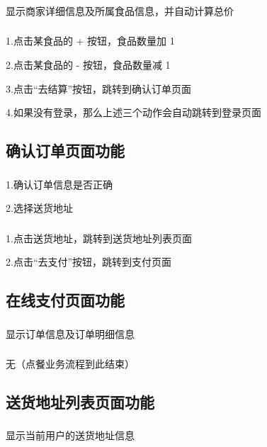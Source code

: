 \subsubsection*{}
显示商家详细信息及所属食品信息，并自动计算总价
\subsubsection*{}
1.点击某食品的 + 按钮，食品数量加 1

2.点击某食品的 - 按钮，食品数量减 1

3.点击“去结算”按钮，跳转到确认订单页面

4.如果没有登录，那么上述三个动作会自动跳转到登录页面~\\

\subsection{确认订单页面功能}
\subsubsection*{}
1.确认订单信息是否正确

2.选择送货地址
\subsubsection*{}
1.点击送货地址，跳转到送货地址列表页面

2.点击“去支付”按钮，跳转到支付页面~\\

\subsection{在线支付页面功能}
\subsubsection*{}
显示订单信息及订单明细信息
\subsubsection*{}
无（点餐业务流程到此结束）~\\

\subsection{送货地址列表页面功能}
\subsubsection*{}
显示当前用户的送货地址信息

